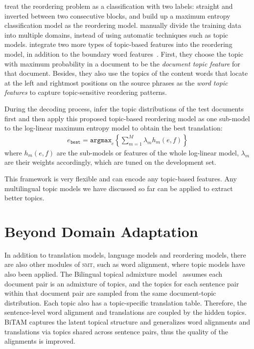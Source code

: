\citet{Xiong-2006} treat the
reordering problem as a classification with two labels: straight and
inverted between two consecutive blocks, and build up a maximum
entropy classification model as the reordering model.
\citet{Chen-2013} manually divide the training data into
multiple domains, instead of using automatic techniques such as topic
models.
\citet{wang-14} integrate two more types of
topic-based features into the reordering model, in addition to the
boundary word features~\citep{Xiong-2006}. First, they choose
the topic with maximum probability in a document to be the
\textit{document topic feature} for that document. Besides, they also
use the topics of the content words that locate at the left and
rightmost positions on the source phrases as the \textit{word topic
  features} to capture topic-sensitive reordering patterns.

During the decoding process, \citet{Xiong-2006} infer the topic
distributions of the test documents first and then apply this proposed
topic-based reordering model as one sub-model to the log-linear maximum entropy model
to obtain the best translation:
\begin{align}
e_\texttt{best} = \texttt{argmax}_e \left\{ \sum_{m=1}^M \lambda_m h_m(e,f) \right\}
\end{align}
where $h_m(e,f)$ are the sub-models or features of the whole
log-linear model, $\lambda_m$ are their weights accordingly, which are
tuned on the development set.

This framework is very flexible and can encode any topic-based features.
Any multilingual topic models we have discussed so far can be
applied to extract better topics.

\section{Beyond Domain Adaptation}

In addition to translation models, language models and reordering models,
there are also other modules of \textsc{smt}, such as word alignment,
where topic models have also been applied. The
Bilingual topical admixture model~\citet[BiTAM]{zhao-06} assumes each document pair is an
admixture of topics, and the topics for each sentence pair within that
document pair are sampled from the same document-topic
distribution. Each topic also has a topic-specific translation
table. Therefore, the sentence-level word alignment and translations
are coupled by the hidden topics.  BiTAM captures the latent
topical structure and generalizes word alignments and translations via
topics shared across sentence pairs, thus the quality of the
alignments is improved.

